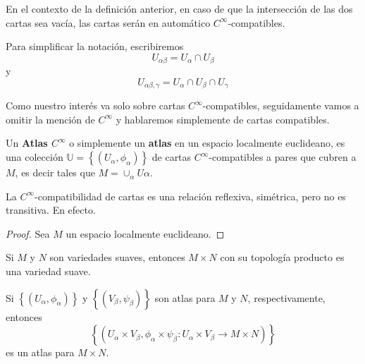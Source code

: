 \documentclass[12pt]{report}
\theoremstyle{largebreak}
\begin{document}
    \begin{obs}
        En el contexto de la definición anterior, en caso de que la intersección de las dos cartas sea vacía, las cartas serán en automático $C^{\infty}$-compatibles.

        Para simplificar la notación, escribiremos
        \begin{equation*}
            U_{\alpha\beta}=U_{\alpha}\cap U_{\beta}
        \end{equation*}
        y
        \begin{equation*}
            U_{\alpha\beta,\gamma}=U_{\alpha}\cap U_{\beta}\cap U_{\gamma}
        \end{equation*}
    \end{obs}

    Como nuestro interés va solo sobre cartas $C^{\infty}$-compatibles, seguidamente vamos a omitir la mención de $C^{\infty}$ y hablaremos simplemente de cartas compatibles.

    \begin{mydef}
        Un \textbf{Atlas $C^{\infty}$} o simplemente un \textbf{atlas} en un espacio localmente euclideano, es una colección $\mathbb{U}=\left\{(U_\alpha, \phi_\alpha)\right\}$ de cartas $C^{\infty}$-compatibles a pares que cubren a $M$, es decir tales que $M=\cup_{\alpha}U\alpha$. 
    \end{mydef}

    \begin{obs}
        La $C^{\infty}$-compatibilidad de cartas es una relación reflexiva, simétrica, pero no es transitiva. En efecto.
    \end{obs}
    \begin{proof}
        Sea $M$ un espacio localmente euclideano. 
    \end{proof}

    \begin{obs}
        Si $M$ y $N$ son variedades suaves, entonces $M\times N$ con su topología producto es una variedad suave.
    \end{obs}

    \begin{propo}
        Si $\left\{(U_{\alpha},\phi_{\alpha})\right\}$ y $\left\{(V_\beta,\psi_\beta)\right\}$ son atlas para $M$ y $N$, respectivamente, entonces
        \begin{equation*}
            \left\{(U_\alpha\times V_\beta,\phi_\alpha\times\psi_\beta:U_\alpha\times V_\beta\rightarrow M\times N)\right\}
        \end{equation*}
        es un atlas para $M\times N$.
    \end{propo}
\end{document}
